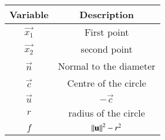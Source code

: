 \begin{tabular}[12pt]{ |c|c|}
    \hline
    \textbf{Variable} & \textbf{Description}\\ 
    \hline
    $\vec{x_1}$ & First point\\
    \hline
    $\vec{x_2}$ & second point\\
    \hline
    $\vec{n}$ & Normal to the diameter\\
    \hline
    $\vec{c}$ & Centre of the circle\\
    \hline
    $\vec{u}$ & $-\vec{c}$\\
    \hline
    $r$ & radius of the circle\\
    \hline
    $f$ & $\left\lVert\mathbf{u}\right\rVert^2-r^2$\\
    \hline
    \end{tabular}
